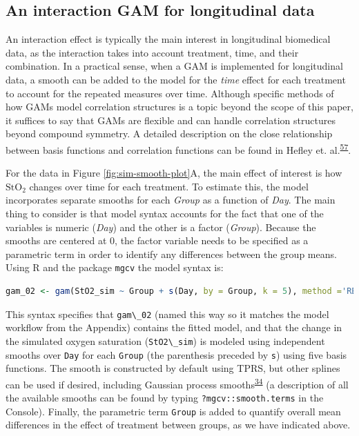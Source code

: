 \documentclass[
]{article}
\newcommand{\passthrough}[1]{#1}
\begin{document}
\hypertarget{an-interaction-gam-for-longitudinal-data}{%
\subsection{An interaction GAM for longitudinal data}\label{an-interaction-gam-for-longitudinal-data}}

An interaction effect is typically the main interest in longitudinal biomedical data, as the interaction takes into account treatment, time, and their combination. In a practical sense, when a GAM is implemented for longitudinal data, a smooth can be added to the model for the \emph{time} effect for each treatment to account for the repeated measures over time. Although specific methods of how GAMs model correlation structures is a topic beyond the scope of this paper, it suffices to say that GAMs are flexible and can handle correlation structures beyond compound symmetry. A detailed description on the close relationship between basis functions and correlation functions can be found in Hefley et. al.\textsuperscript{\protect\hyperlink{ref-hefley2017}{57}}.

For the data in Figure \ref{fig:sim-smooth-plot}A, the main effect of interest is how \(\mbox{StO}_2\) changes over time for each treatment. To estimate this, the model incorporates separate smooths for each \emph{Group} as a function of \emph{Day}. The main thing to consider is that model syntax accounts for the fact that one of the variables is numeric (\emph{Day}) and the other is a factor (\emph{Group}). Because the smooths are centered at 0, the factor variable needs to be specified as a parametric term in order to identify any differences between the group means. Using R and the package \passthrough{\lstinline!mgcv!} the model syntax is:

\begin{lstlisting}[language=R]
gam_02 <- gam(StO2_sim ~ Group + s(Day, by = Group, k = 5), method ='REML', data = dat_sim)
\end{lstlisting}

This syntax specifies that \passthrough{\lstinline!gam\_02!} (named this way so it matches the model workflow from the Appendix) contains the fitted model, and that the change in the simulated oxygen saturation (\passthrough{\lstinline!StO2\_sim!}) is modeled using independent smooths over \passthrough{\lstinline!Day!} for each \passthrough{\lstinline!Group!} (the parenthesis preceded by \passthrough{\lstinline!s!}) using five basis functions. The smooth is constructed by default using TPRS, but other splines can be used if desired, including Gaussian process smooths\textsuperscript{\protect\hyperlink{ref-simpson2018}{34}} (a description of all the available smooths can be found by typing \passthrough{\lstinline!?mgcv::smooth.terms!} in the Console). Finally, the parametric term \passthrough{\lstinline!Group!} is added to quantify overall mean differences in the effect of treatment between groups, as we have indicated above.
\end{document}
